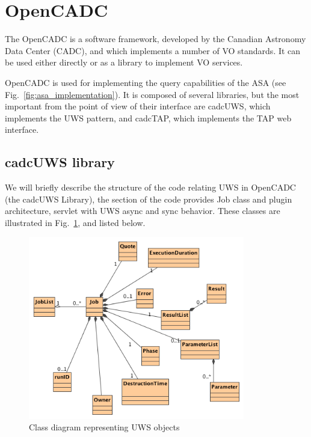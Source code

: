 

\section{OpenCADC} %
\label{sec:opencadc}

The
OpenCADC
is a software framework, developed by the
Canadian Astronomy Data Center (CADC), and which implements a number of VO standards. It can be used either directly or as a library to implement VO services.

OpenCADC is used for implementing the query capabilities of the ASA (see Fig.~\ref{fig:asa_implementation}). It is composed of several libraries, but the most important from the point of view of their interface are cadcUWS, which implements the UWS pattern, and cadcTAP, which implements the TAP web interface.

\subsection{cadcUWS library} %
\label{sub:cadcuws_library}

We will briefly describe
the structure of the code relating UWS in OpenCADC (the cadcUWS Library), the section of the code provides Job class and plugin architecture, servlet with UWS async and sync behavior. These classes are illustrated in Fig.~\ref{fig:uwsjobs}, and listed below.

\begin{figure}[tb]
\centering
\includegraphics[height=8cm]{images/Class_Diagram__UWS__UWSObjects.png}
\caption{Class diagram representing UWS objects}
\label{fig:uwsjobs}
\end{figure}

